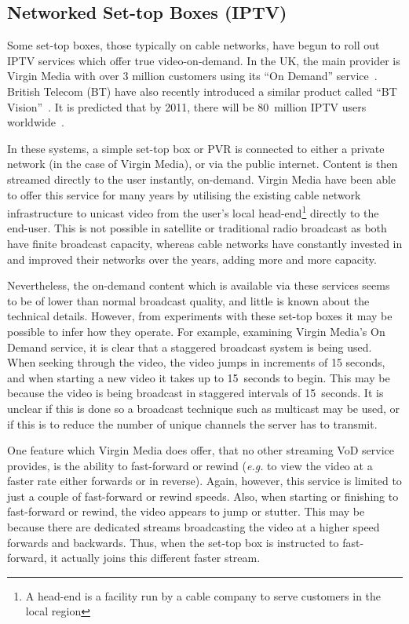 \subsection{Networked Set-top Boxes (IPTV)}


    Some set-top boxes, those typically on cable networks, have begun to roll out IPTV services which offer true video-on-demand. In the UK, the main provider is Virgin Media with over 3 million customers using its ``On Demand'' service~\cite{virgin2008on}. British Telecom (BT) have also recently introduced a similar product called ``BT Vision''~\cite{bt2008bv}. It is predicted that by 2011, there will be 80~million IPTV users worldwide~\cite{olausson2007gif}.

    In these systems, a simple set-top box or PVR is connected to either a private network (in the case of Virgin Media), or via the public internet. Content is then streamed directly to the user instantly, on-demand. Virgin Media have been able to offer this service for many years by utilising the existing cable network infrastructure to unicast video from the user's local head-end\footnote{A head-end is a facility run by a cable company to serve customers in the local region}  directly to the end-user. This is not possible in satellite or traditional radio broadcast as both have finite broadcast capacity, whereas cable networks have constantly invested in and improved their networks over the years, adding more and more capacity.

    Nevertheless, the on-demand content which is available via these services seems to be of lower than normal broadcast quality, and little is known about the technical details. However, from experiments with these set-top boxes it may be possible to infer how they operate. For example, examining Virgin Media's On Demand service, it is clear that a staggered broadcast system is being used. When seeking through the video, the video jumps in increments of 15 seconds, and when starting a new video it takes up to 15~seconds to begin. This may be because the video is being broadcast in staggered intervals of 15~seconds. It is unclear if this is done so a broadcast technique such as multicast may be used, or if this is to reduce the number of unique channels the server has to transmit.

    One feature which Virgin Media does offer, that no other streaming VoD service provides, is the ability to fast-forward or rewind (\emph{e.g.} to view the video at a faster rate either forwards or in reverse). Again, however, this service is limited to just a couple of fast-forward or rewind speeds. Also, when starting or finishing to fast-forward or rewind, the video appears to jump or stutter. This may be because there are dedicated streams broadcasting the video at a higher speed forwards and backwards. Thus, when the set-top box is instructed to fast-forward, it actually joins this different faster stream.


